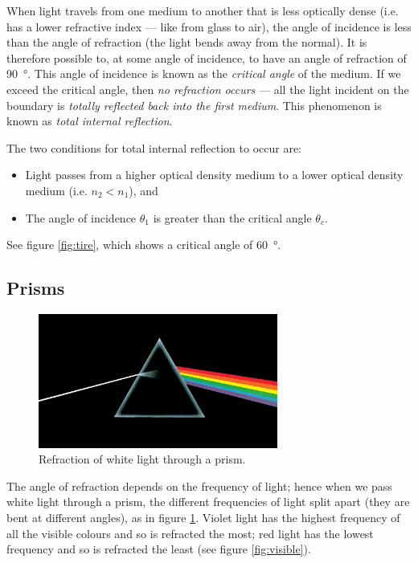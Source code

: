 \documentclass[a4paper]{amsbook}
\newcommand\capcite[1]{}
\begin{document}
When light travels from one medium to another that is less optically dense (i.e. has a lower refractive index --- like from glass to air),
the angle of incidence is less than the angle of refraction (the light bends away from the normal). It is therefore possible to, at some
angle of incidence, to have an angle of refraction of \SI{90}{\degree}. This angle of incidence is known as the \textit{critical angle}
of the medium. If we exceed the critical angle, then \textit{no refraction occurs} --- all the light incident on the boundary is \textit{totally
reflected back into the first medium}. This phenomenon is known as \textit{total internal reflection}.

The two conditions for total internal reflection to occur are:
\begin{itemize}
  \item Light passes from a higher optical density medium to a lower optical density medium (i.e. $ n_2 < n_1 $), and
  \item The angle of incidence $ \theta_1 $ is greater than the critical angle $ \theta_c $.
\end{itemize}

See figure \ref{fig:tire}, which shows a critical angle of \SI{60}{\degree}.

\subsection{Prisms}
\begin{figure}
  \centering
  \includegraphics[width=0.7\textwidth]{prism}
  \caption{Refraction of white light through a prism. \capcite{https://www.jambase.com/wp-content/uploads/2016/03/DSOTM-Crop-1480x832.jpg}\label{fig:prism}}
\end{figure}
The angle of refraction depends on the frequency of light; hence when we pass white light through a prism, the different frequencies
of light split apart (they are bent at different angles), as in figure \ref{fig:prism}. Violet light has the highest frequency of all the visible
colours and so is refracted the most; red light has the lowest frequency and so is refracted the least (see figure \ref{fig:visible}).
\end{document}
